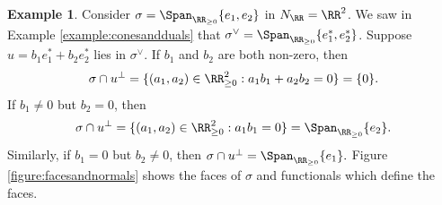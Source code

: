 \documentclass[12pt]{amsart}
\theoremstyle{plain}
\theoremstyle{definition}
\newtheorem{example}[theorem]{Example}
\begin{document}
\begin{example}
Consider $\sigma = \Span_{\RR_{\ge 0}} \{e_1, e_2\}$ in $N_\RR = \RR^2$.
We saw in Example \ref{example:conesandduals} that $\sigma^\vee = \Span_{\RR_{\ge 0}}\{e_1^*, e_2^*\}$.
Suppose $u = b_1 e_1^* + b_2 e_2^*$ lies in $\sigma^\vee$.
If $b_1$ and $b_2$ are both non-zero, then
$$\sigma \cap u^\perp = \{(a_1, a_2) \in \RR_{\ge 0}^2 : a_1 b_1 + a_2 b_2 = 0\} = \{0\}.$$
If $b_1 \ne 0$ but $b_2 = 0$, then
$$\sigma \cap u^\perp = \{(a_1, a_2) \in \RR_{\ge 0}^2 : a_1 b_1 = 0\} = \Span_{\RR_{\ge 0}}\{e_2\}.$$
Similarly, if $b_1 = 0$ but $b_2 \ne 0$, then $\sigma \cap u^\perp = \Span_{\RR_{\ge 0}} \{e_1\}.$
Figure \ref{figure:facesandnormals} shows the faces of $\sigma$ and functionals which define the faces.
\end{example}

%            
%            
%
%
%        
%            
%            
%
%
\end{document}

